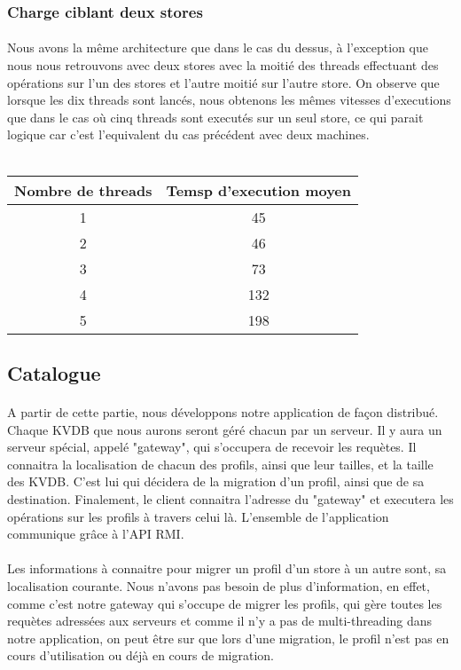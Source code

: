 \subsubsection{Charge ciblant deux stores}
\paragraph{}
Nous avons la même architecture que dans le cas du dessus, à l'exception que nous nous retrouvons avec deux stores avec la moitié des threads effectuant des opérations sur l'un des stores et l'autre moitié sur l'autre store.
On observe que lorsque les dix threads sont lancés, nous obtenons les mêmes vitesses d'executions que dans le cas où cinq threads sont executés sur un seul store, ce qui parait logique car c'est l'equivalent du cas précédent avec deux machines.
\\
\\
\begin{tabular}{|c|c|}
    \hline
    Nombre de threads & Temsp d'execution moyen \tabularnewline
    \hline
    1 & 45 \tabularnewline
    2 & 46 \tabularnewline
    3 & 73 \tabularnewline
    4 & 132 \tabularnewline
    5 & 198 \tabularnewline
    \hline
 \end{tabular}

\subsection{Catalogue}

\paragraph{}
A partir de cette partie, nous développons notre application de façon distribué. Chaque KVDB que nous aurons seront géré chacun par un serveur. Il y aura un serveur spécial, appelé "gateway", qui s'occupera de recevoir les requètes. Il connaitra la localisation de chacun des profils, ainsi que leur tailles, et la taille des KVDB. C'est lui qui décidera de la migration d'un profil, ainsi que de sa destination.
Finalement, le client connaitra l'adresse du "gateway" et executera les opérations sur les profils à travers celui là.
L'ensemble de l'application communique grâce à l'API RMI.


\paragraph{}
Les informations à connaitre pour migrer un profil d'un store à un autre sont, sa localisation courante. Nous n'avons pas besoin de plus d'information, en effet, comme c'est notre gateway qui s'occupe de migrer les profils, qui gère toutes les requètes adressées aux serveurs et comme il n'y a pas de multi-threading dans notre application, on peut être sur que lors d'une migration, le profil n'est pas en cours d'utilisation ou déjà en cours de migration.

